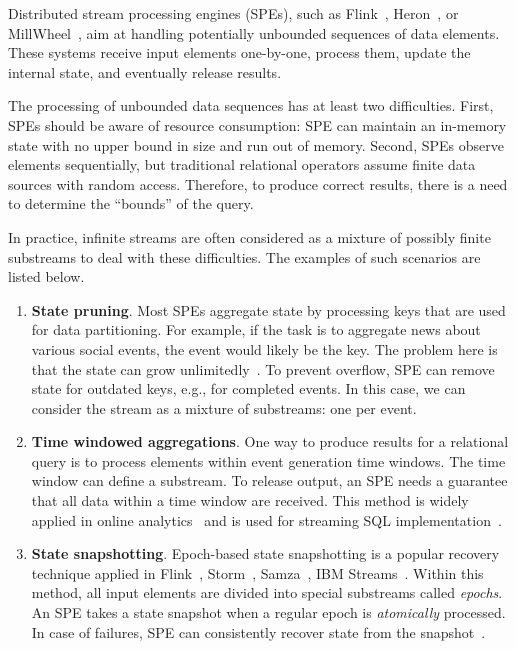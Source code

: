 \label {fs-acker-intro}

Distributed stream processing engines (SPEs), such as Flink~\cite{carbone2015apache}, Heron~\cite{Kulkarni:2015:THS:2723372.2742788}, or MillWheel~\cite{Akidau:2013:MFS:2536222.2536229}, aim at handling potentially unbounded sequences of data elements. These systems receive input elements one-by-one, process them, update the internal state, and eventually release results. 

The processing of unbounded data sequences has at least two difficulties. First, SPEs should be aware of resource consumption: SPE can maintain an in-memory state with no upper bound in size and run out of memory. Second, SPEs observe elements sequentially, but traditional relational operators assume finite data sources with random access. Therefore, to produce correct results, there is a need to determine the ``bounds'' of the query.

In practice, infinite streams are often considered as a mixture of possibly finite substreams to deal with these difficulties. The examples of such scenarios are listed below.
\begin{enumerate}
    \item {\bf State pruning}. Most SPEs aggregate state by processing keys that are used for data partitioning. For example, if the task is to aggregate news about various social events, the event would likely be the key. The problem here is that the state can grow unlimitedly~\cite{Tucker:2003:EPS:776752.776780}. To prevent overflow, SPE can remove state for outdated keys, e.g., for completed events. In this case, we can consider the stream as a mixture of substreams: one per event.  
    \item {\bf Time windowed aggregations}. One way to produce results for a relational query is to process elements within event generation time windows. The time window can define a substream. To release output, an SPE needs a guarantee that all data within a time window are received. This method is widely applied in online analytics~\cite{traub2018scotty} and is used for streaming SQL implementation~\cite{Begoli:2019:OSR:3299869.3314040}.
    \item {\bf State snapshotting}. Epoch-based state snapshotting is a popular recovery technique applied in Flink~\cite{Carbone:2017:SMA:3137765.3137777}, Storm~\cite{Toshniwal:2014:STO:2588555.2595641}, Samza~\cite{Noghabi:2017:SSS:3137765.3137770}, IBM Streams~\cite{jacques2016consistent}. Within this method, all input elements are divided into special substreams called {\em epochs}. An SPE takes a state snapshot when a regular epoch is {\em atomically} processed. In case of failures, SPE can consistently recover state from the snapshot~\cite{2015arXiv150608603C}. 
\end{enumerate}

